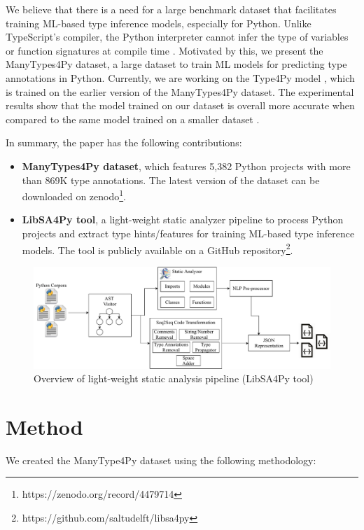 \documentclass[10pt, conference]{IEEEtran}
\begin{document}
We believe that there is a need for a large benchmark dataset that facilitates training ML-based type inference models, especially for Python. Unlike TypeScript's compiler, the Python interpreter cannot infer the type of variables or function signatures at compile time \cite{scott16}. Motivated by this, we present the ManyTypes4Py dataset, a large dataset to train ML models for predicting type annotations in Python. Currently, we are working on the Type4Py model \cite{mir2021type4py}, which is trained on the earlier version of the ManyTypes4Py dataset. The experimental results show that the model trained on our dataset is overall more accurate when compared to the same model trained on a smaller dataset \cite{mir2021type4py}.

In summary, the paper has the following contributions:
\begin{itemize}
	\item \textbf{ManyTypes4Py dataset}, which features 5,382 Python projects with more than 869K type annotations. The latest version of the dataset can be downloaded on zenodo\footnote{https://zenodo.org/record/4479714}.
	\item \textbf{LibSA4Py tool}, a light-weight static analyzer pipeline to process Python projects and extract type hints/features for training ML-based type inference models. The tool is publicly available on a GitHub repository\footnote{https://github.com/saltudelft/libsa4py}.
\end{itemize}


\begin{figure}[!t]
	\centering
	\includegraphics[width=0.8\linewidth]{figs/manytypes4py-pipeline.pdf}
	\caption{Overview of light-weight static analysis pipeline (LibSA4Py tool)}
	\label{fig:overview-pipeline-sa}
\end{figure}

\section{Method}\label{sec:method}
We created the ManyType4Py dataset using the following methodology:
\end{document}
